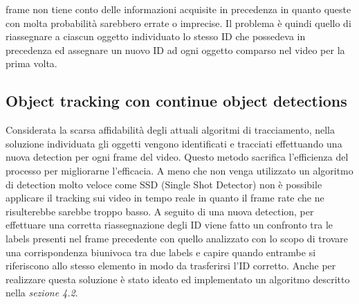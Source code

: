 frame non tiene conto delle informazioni acquisite in precedenza in quanto queste con molta probabilità sarebbero errate o imprecise. Il problema è quindi quello di riassegnare a ciascun oggetto individuato lo stesso ID che possedeva in precedenza ed assegnare un nuovo ID ad ogni oggetto comparso nel video per la prima volta. 
\subsection{Object tracking con continue object detections}
Considerata la scarsa affidabilità degli attuali algoritmi di tracciamento, nella soluzione individuata gli oggetti vengono identificati e tracciati effettuando una nuova detection per ogni frame del video. Questo metodo sacrifica l'efficienza del processo per migliorarne l'efficacia. A meno che non venga utilizzato un algoritmo di detection molto veloce come SSD (Single Shot Detector) non è possibile applicare il tracking sui video in tempo reale in quanto il frame rate che ne risulterebbe sarebbe troppo basso. A seguito di una nuova detection, per effettuare una corretta riassegnazione degli ID viene fatto un confronto tra le labels presenti nel frame precedente con quello analizzato con lo scopo di trovare una corrispondenza biunivoca tra due labels e capire quando entrambe si riferiscono allo stesso elemento in modo da trasferirsi l'ID corretto. Anche per realizzare questa soluzione è stato ideato ed implementato un algoritmo descritto nella \textit{sezione 4.2}.
